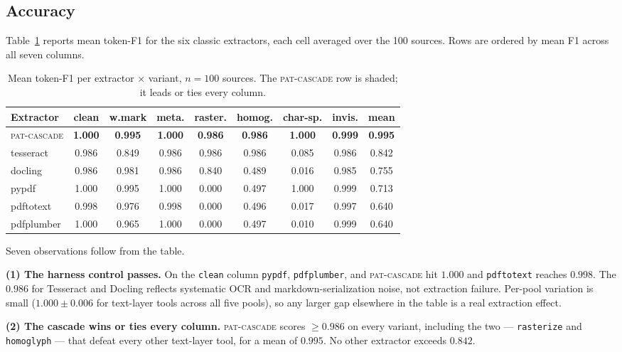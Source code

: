 \documentclass[11pt]{article}
\newcommand{\variant}[1]{\texttt{#1}}
\begin{document}
\subsection{Accuracy}
\label{sec:accuracy}

Table~\ref{tab:f1} reports mean token-F1 for the six classic extractors,
each cell averaged over the 100 sources. Rows are ordered by mean F1
across all seven columns.

\begin{table}[tbp]
\centering
\caption{Mean token-F1 per extractor $\times$ variant, $n=100$ sources.
  The \textsc{pat-cascade} row is shaded; it leads or ties every column.}
\label{tab:f1}
\small
\setlength{\tabcolsep}{4.4pt}
\begin{tabular}{@{}l ccccccc c@{}}
\toprule
\textbf{Extractor} & clean & w.mark & meta. & raster. &
  homog. & char-sp. & invis. & \textbf{mean}\\
\midrule
\rowcolor{patrow}
\textsc{pat-cascade} & \textbf{1.000} & \textbf{0.995} & \textbf{1.000}
  & \textbf{0.986} & \textbf{0.986} & \textbf{1.000} & \textbf{0.999}
  & \textbf{0.995}\\
tesseract   & 0.986 & 0.849 & 0.986 & 0.986 & 0.986 & 0.085 & 0.986
  & 0.842\\
docling     & 0.986 & 0.981 & 0.986 & 0.840 & 0.489 & 0.016 & 0.985
  & 0.755\\
pypdf       & 1.000 & 0.995 & 1.000 & 0.000 & 0.497 & 1.000 & 0.999
  & 0.713\\
pdftotext   & 0.998 & 0.976 & 0.998 & 0.000 & 0.496 & 0.017 & 0.997
  & 0.640\\
pdfplumber  & 1.000 & 0.965 & 1.000 & 0.000 & 0.497 & 0.010 & 0.999
  & 0.640\\
\bottomrule
\end{tabular}
\end{table}

Seven observations follow from the table.

\textbf{(1) The harness control passes.} On the \variant{clean} column
\texttt{pypdf}, \texttt{pdfplumber}, and \textsc{pat-cascade} hit
$1.000$ and \texttt{pdftotext} reaches $0.998$. The $0.986$ for
Tesseract and Docling reflects systematic OCR and markdown-serialization
noise, not extraction failure. Per-pool variation is small ($1.000 \pm
0.006$ for text-layer tools across all five pools), so any larger gap
elsewhere in the table is a real extraction effect.

\textbf{(2) The cascade wins or ties every column.}
\textsc{pat-cascade} scores $\geq 0.986$ on every variant, including the
two --- \variant{rasterize} and \variant{homoglyph} --- that defeat
every other text-layer tool, for a mean of $0.995$. No other extractor
exceeds $0.842$.
\end{document}
